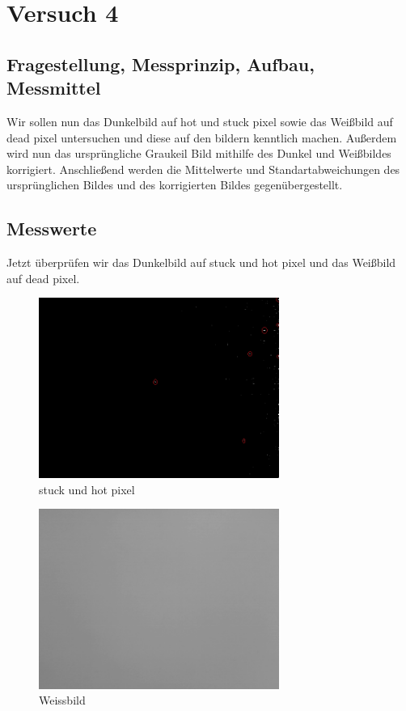 \documentclass[TGAI_Laborbericht.tex]{subfiles}
\begin{document}
\chapter{Versuch 4}
\label{chap:VERSUCH_4}

\section{Fragestellung, Messprinzip, Aufbau, Messmittel}
\label{chap:VERSUCH_4_FRAGESTELLUNG}
Wir sollen nun das Dunkelbild auf hot und stuck pixel sowie das Weißbild auf dead pixel untersuchen und diese auf den bildern kenntlich machen. Außerdem wird nun das ursprüngliche Graukeil Bild mithilfe des Dunkel und Weißbildes korrigiert. Anschließend werden die Mittelwerte und Standartabweichungen des ursprünglichen Bildes und des korrigierten Bildes gegenübergestellt.

\section{Messwerte}
\label{chap:VERSUCH_4_MESSWERTE}
Jetzt überprüfen wir das Dunkelbild auf stuck und hot pixel und das Weißbild auf dead pixel.
\begin{figure}[H]
	\includegraphics[width=0.7\textwidth]{media/stuck&hotpixel.png}
	\caption{stuck und hot pixel}
	\label{fig:stuck und hot pixel}
\end{figure}

\begin{figure}[H]
	\includegraphics[width=0.7\textwidth]{media/Weissbild.png}
	\caption{Weissbild}
	\label{fig:Weissbild}
\end{figure}
\end{document}
